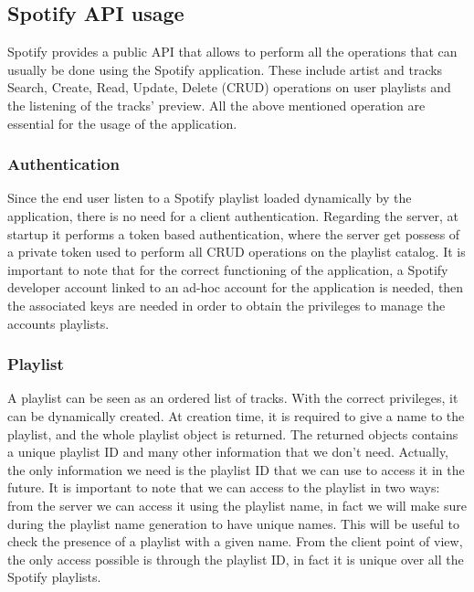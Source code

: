 \documentclass[paper=a4, fontsize=11pt]{scrartcl}
\begin{document}
\subsection{Spotify API usage}
Spotify provides a public API that allows to perform all the operations that can usually be done using the Spotify application. These include artist and tracks Search, Create, Read, Update, Delete (CRUD) operations on user playlists and the listening of the tracks' preview.
All the above mentioned operation are essential for the usage of the application.
\subsubsection{Authentication}
Since the end user listen to a Spotify playlist loaded dynamically by the application, there is no need for a client authentication. Regarding the server, at startup it performs a token based authentication, where the server get possess of a private token used to perform all CRUD operations on the playlist catalog.
It is important to note that for the correct functioning of the application, a Spotify developer account linked to an ad-hoc account for the application is needed, then the associated keys are needed in order to obtain the privileges to manage the accounts playlists.
\subsubsection{Playlist}
A playlist can be seen as an ordered list of tracks. With the correct privileges, it can be dynamically created. At creation time, it is required to give a name to the playlist, and the whole playlist object is returned. The returned objects contains a unique playlist ID and many other information that we don't need. Actually, the only information we need is the playlist ID that we can use to access it in the future. It is important to note that we can access to the playlist in two ways: from the server we can access it using the playlist name, in fact we will make sure during the playlist name generation to have unique names. This will be useful to check the presence of a playlist with a given name. From the client point of view, the only access possible is through the playlist ID, in fact it is unique over all the Spotify playlists.
\end{document}
